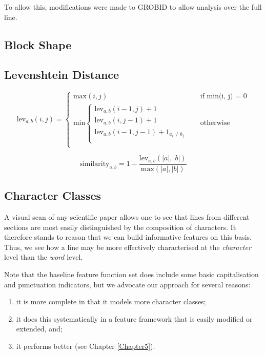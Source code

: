 To allow this, modifications were made to GROBID to allow analysis over the full line.

\subsection{Block Shape}

\subsection{Levenshtein Distance}

\begin{equation}
  \text{lev}_{a, b}(i, j) = 
  \begin{cases} 
  	\text{max}(i, j) &\quad\text{if min(i, j) = 0} \\
	\text{min}
		\begin{cases}
			\text{lev}_{a, b}(i - 1, j) + 1 \\
			\text{lev}_{a, b}(i, j - 1) + 1 \\
			\text{lev}_{a, b}(i - 1, j - 1) + 1_{a_i \neq b_j} \\
		\end{cases} &\quad\text{otherwise} \\
  \end{cases}
\label{eq:levenshtein}
\end{equation}

\begin{equation}
\text{similarity}_{a, b} = 1 - \frac{\text{lev}_{a, b}(|a|, |b|)}{\text{max}(|a|, |b|)}
\label{eq:levenshteinsimilarity}
\end{equation}

\subsection{Character Classes}

A visual scan of any scientific paper allows one to see that lines from different sections are most easily distinguished by the composition of characters. It therefore stands to reason that we can build informative features on this basis. Thus, we see how a line may be more effectively characterised at the \emph{character} level than the \emph{word} level.

Note that the baseline feature function set does include some basic capitalisation and punctuation indicators, but we advocate our approach for several reasons:

\begin{enumerate}
\item it is more complete in that it models more character classes;
\item it does this systematically in a feature framework that is easily modified or extended, and;
\item it performs better (see Chapter \ref{Chapter5}).
\end{enumerate}

